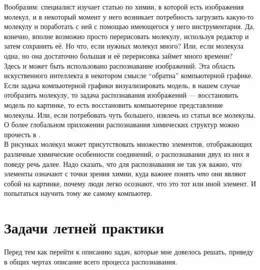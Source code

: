 \noindent Вообразим: специалист изучает статью по химии, в которой есть изображения молекул, и в некоторый момент у него возникает 
потребность загрузить какую-то молекулу и поработать с ней с помощью имеющегося у него инструментария. Да, конечно,
вполне возможно просто перерисовать молекулу, используя редактор и затем сохранить её. Но что, если нужных молекул много? 
Или, если молекула одна, но она достаточно большая и её перерисовка займет много времени? \\ 

\noindent 
Здесь и может быть использовано распознавание изображений. Эта область искуственного интеллекта в некотором смысле ``обратна'' 
компьютерной графике. Если задача компьютерной графики визуализировать модель, в нашем случае отобразить молекулу, то задача 
распознавания изображений --- восстановить модель по картинке, то есть восстановить компьютерное представление молекулы. Или, 
если потребовать чуть большего, извлечь из статьи все молекулы. О более глобальном приложении распознавания химических структур 
можно прочесть в \cite{pavlov}.\\

\noindent
В рисунках молекул может присутствовать множество элементов, отображающих различные химические особенности соединений,
о распознавании двух из них я поведу речь далее. Надо сказать, что для распознавания не так уж важно, что элементы означают с точки 
зрения химии, куда важнее понять \emph{что} они являют собой на картинке, почему люди легко осознают, что это тот или 
иной элемент. И попытаться научить тому же самому компьютер. 

\pagebreak

\section{Задачи летней практики}
\label{sec:tasks}
\noindent
Перед тем как перейти к описанию задач, которые мне довелось решать, приведу в общих чертах описание всего процесса распознавания.

